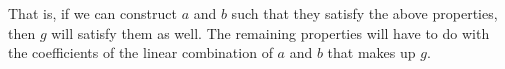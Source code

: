That is, if we can construct $a$ and $b$ such that they satisfy the above properties, then $g$ will satisfy them as well. The remaining properties will have to do with the coefficients of the linear combination of $a$ and $b$ that makes up $g$.



\begin{comment}
    ** Note: we gotta include PolyFourierCoeffBound somewhere!! **

    Maybe it's better to say ``here's how Viazovska did it'' and just outline her paper and then say ``here's what's different about the overall structure in Lean'' and outline a few things like the way we decided to structure the MagicFunction bit of the repo. Things like
    1. Wanting reusability: keeping `PolyFourierCoeffBound` separate
    2. Modularity: splitting it up from `ModularForms`
    3. Namespacing to avoid clashes (eg. a as a function and a as a SchwartzMap term)
    4. The strategy for the integrals: using real parametrisations and using straight contours instead of circular ones
\end{comment}

